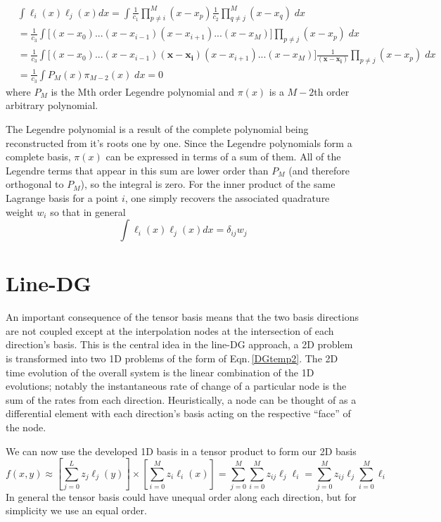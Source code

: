 \documentclass[letterpaper,12pt]{report}
\newcommand{\be}{\begin{equation}}
\newcommand{\ee}{\end{equation}}
\begin{document}
\be \begin{split} &\int \ell_i(x) \ell_j(x) dx = \int \frac{1}{c_1} \prod_{p\neq i}^M (x-x_p) \frac{1}{c_2}\prod_{q \neq j}^M (x-x_q) \;dx \\ 
&=\frac{1}{c_3} \int  \Big[(x-x_0)...(x-x_{i-1})(x-x_{i+1})...(x-x_M)\Big]\prod_{p \neq j} (x-x_p) \;dx\\
&=\frac{1}{c_3} \int  \Big[(x-x_0)...(x-x_{i-1}) \boldsymbol{(x-x_i)}(x-x_{i+1})...(x-x_M)\Big] \frac{1}{\boldsymbol{(x-x_i)}}\prod_{p \neq j} (x-x_p) \;dx\\
&=\frac{1}{c_3} \int  P_M(x) \pi_{M-2}(x) \;dx= 0\end{split}\ee
where $P_M$ is the Mth order Legendre polynomial and $\pi(x)$ is a $M-2$th order arbitrary polynomial.

The Legendre polynomial is a result of the complete polynomial being reconstructed from it's roots one by one. Since the Legendre polynomials form a complete basis, $\pi(x)$ can be expressed in terms of a sum of them. All of the Legendre terms that appear in this sum are lower order than $P_M$ (and therefore orthogonal to $P_M$), so the integral is zero. For the inner product of the same Lagrange basis for a point $i$, one simply recovers the associated quadrature weight $w_i$ so that in general
\be \int \ell_i(x) \ell_j(x) dx = \delta_{ij} w_j \ee

%
\section{Line-DG}
An important consequence of the tensor basis means that the two basis directions are not coupled except at the interpolation nodes at the intersection of each direction's basis. This is the central idea in the line-DG \cite{Persson2013} approach, a 2D problem is transformed into two 1D problems of the form of Eqn.\,\eqref{DGtemp2}. The 2D time evolution of the overall system is the linear combination of the 1D evolutions; notably the instantaneous rate of change of a particular node is the sum of the rates from each direction. Heuristically, a node can be thought of as a differential element with each direction's basis acting on the respective ``face'' of the node.

We can now use the developed 1D basis in a tensor product to form our 2D basis
\be f(x,y) \approx \left[\sum_{j=0}^L z_j \ell_j(y) \right] \times \left[ \sum_{i=0}^M z_i \ell_i(x) \right] = \sum_{j=0}^M \sum_{i=0}^M z_{ij} \ell_j \ell_i =  \sum_{j=0}^M z_{ij} \ell_j \sum_{i=0}^M  \ell_i \ee
In general the tensor basis could have unequal order along each direction, but for simplicity we use an equal order.
\end{document}
